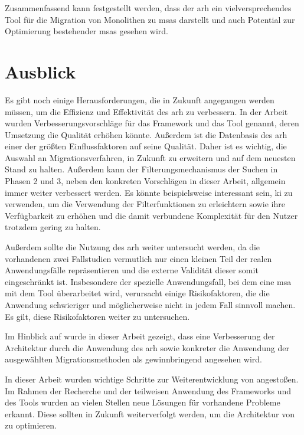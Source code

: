 Zusammenfassend kann festgestellt werden, dass der \gls{arh} ein vielversprechendes Tool für die Migration von Monolithen zu \glspl{msa} darstellt und auch Potential zur Optimierung bestehender \glspl{msa} gesehen wird.

\section{Ausblick}

Es gibt noch einige Herausforderungen, die in Zukunft angegangen werden müssen, um die Effizienz und Effektivität des \gls{arh} zu verbessern.
In der Arbeit wurden Verbesserungsvorschläge für das Framework und das Tool genannt, deren Umsetzung die Qualität erhöhen könnte.
Außerdem ist die Datenbasis des \gls{arh} einer der größten Einflussfaktoren auf seine Qualität.
Daher ist es wichtig, die Auswahl an Migrationsverfahren, \bpp in Zukunft zu erweitern und auf dem neuesten Stand zu halten.
Außerdem kann der Filterungsmechanismus der Suchen in Phasen 2 und 3, neben den konkreten Vorschlägen in dieser Arbeit, allgemein immer weiter verbessert werden.
Es könnte beispielsweise interessant sein, \gls{ki} zu verwenden, um die Verwendung der Filterfunktionen zu erleichtern sowie ihre Verfügbarkeit zu erhöhen und die damit verbundene Komplexität für den Nutzer trotzdem gering zu halten.

Außerdem sollte die Nutzung des \gls{arh} weiter untersucht werden, da die vorhandenen zwei Fallstudien vermutlich nur einen kleinen Teil der realen Anwendungsfälle repräsentieren und die externe Validität dieser somit eingeschränkt ist.
Insbesondere der spezielle Anwendungsfall, bei dem eine \gls{msa} mit dem Tool überarbeitet wird, verursacht einige Risikofaktoren, die die Anwendung schwieriger und möglicherweise nicht in jedem Fall sinnvoll machen.
Es gilt, diese Risikofaktoren weiter zu untersuchen.

Im Hinblick auf \jf wurde in dieser Arbeit gezeigt, dass eine Verbesserung der Ar\-chi\-tek\-tur durch die Anwendung des \gls{arh} sowie konkreter die Anwendung der ausgewählten Migrationsmethoden als gewinnbringend angesehen wird.

In dieser Arbeit wurden wichtige Schritte zur Weiterentwicklung von \jf angestoßen.
Im Rahmen der Recherche und der teilweisen Anwendung des Frameworks und des Tools wurden an vielen Stellen neue Lösungen für vorhandene Probleme erkannt.
Diese sollten in Zukunft weiterverfolgt werden, um die Architektur von \jf zu optimieren.


